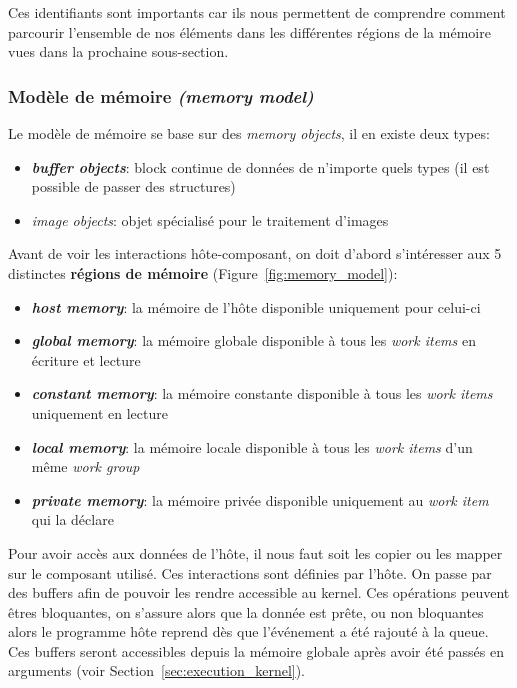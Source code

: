 Ces identifiants sont importants car ils nous permettent de comprendre comment parcourir 
l'ensemble de nos éléments dans les différentes régions de la mémoire vues dans la 
prochaine sous-section.

\subsubsection{Modèle de mémoire \textit{(memory model)}}\label{sec:memory_model}

Le modèle de mémoire se base sur des \textit{memory objects}, il en existe deux types:
\begin{itemize}
    \item \textbf{\textit{buffer objects}}: block continue de données de n'importe quels types 
        (il est possible de passer des structures)
    \item \textit{image objects}: objet spécialisé pour le traitement d'images
\end{itemize}

Avant de voir les interactions hôte-composant, on doit d'abord s'intéresser aux 
5 distinctes \textbf{régions de mémoire} (Figure~\ref{fig:memory_model}):
\begin{itemize}
    \item \textbf{\textit{host memory}}: la mémoire de l'hôte disponible uniquement 
        pour celui-ci
    \item \textbf{\textit{global memory}}: la mémoire globale disponible à tous les 
        \textit{work items} en écriture et lecture
    \item \textbf{\textit{constant memory}}: la mémoire constante disponible à tous 
        les \textit{work items} uniquement en lecture
    \item \textbf{\textit{local memory}}: la mémoire locale disponible à tous les 
        \textit{work items} d'un même \textit{work group}
    \item \textbf{\textit{private memory}}: la mémoire privée disponible uniquement 
        au \textit{work item} qui la déclare
\end{itemize}

Pour avoir accès aux données de l'hôte, il nous faut soit les copier ou les mapper 
sur le composant utilisé. Ces interactions sont définies par l'hôte. On passe par 
des buffers afin de pouvoir les rendre accessible au kernel. Ces opérations peuvent 
êtres bloquantes, on s'assure alors que la donnée est prête, ou non bloquantes 
alors le programme hôte reprend dès que l'événement a été rajouté à la queue. 
Ces buffers seront accessibles depuis la mémoire globale après avoir été passés en
arguments (voir Section~\ref{sec:execution_kernel}).

